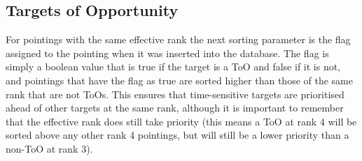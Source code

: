 \subsection{Targets of Opportunity}
\label{sec:toos}
\begin{colsection}

For pointings with the same effective rank the next sorting parameter is the  flag assigned to the pointing when it was inserted into the database. The flag is simply a boolean value that is true if the target is a ToO and false if it is not, and pointings that have the flag as true are sorted higher than those of the same rank that are not ToOs. This ensures that time-sensitive targets are prioritised ahead of other targets at the same rank, although it is important to remember that the effective rank does still take priority (this means a ToO at rank 4 will be sorted above any other rank 4 pointings, but will still be a lower priority than a non-ToO at rank 3).

\end{colsection}


